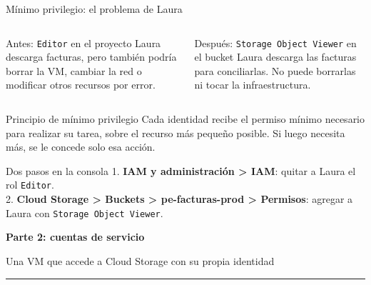 \documentclass[aspectratio=169,10pt,c]{beamer}
\newcommand{\separador}[2]{%
\begin{frame}[plain]
\vfill
\begin{center}
{\fontsize{29}{34}\selectfont\bfseries #1}\par
\vspace{2mm}
{\small #2}\par
\vspace{4mm}
{\color{utpRojo}\rule{8.5cm}{1.2pt}}
\end{center}
\vfill
\end{frame}}
\begin{document}
\begin{frame}{Mínimo privilegio: el problema de Laura}
\begin{columns}[T,onlytextwidth]
\begin{alertblock}{Antes: \texttt{Editor} en el proyecto}
\small Laura descarga facturas, pero también podría borrar la VM, cambiar la red o modificar otros recursos por error.
\end{alertblock}
\begin{exampleblock}{Después: \texttt{Storage Object Viewer} en el bucket}
\small Laura descarga las facturas para conciliarlas. No puede borrarlas ni tocar la infraestructura.
\end{exampleblock}
\end{columns}
\par\vspace{4mm}
\begin{block}{Principio de mínimo privilegio}
\small Cada identidad recibe el permiso mínimo necesario para realizar su tarea, sobre el recurso más pequeño posible. Si luego necesita más, se le concede solo esa acción.
\end{block}
\par\vspace{2mm}
\begin{block}{Dos pasos en la consola}
\small 1. \textbf{IAM y administración > IAM}: quitar a Laura el rol \texttt{Editor}.\\
2. \textbf{Cloud Storage > Buckets > pe-facturas-prod > Permisos}: agregar a Laura con \texttt{Storage Object Viewer}.
\end{block}
\end{frame}

\separador{Parte 2: cuentas de servicio}{Una VM que accede a Cloud Storage con su propia identidad}
\end{document}
